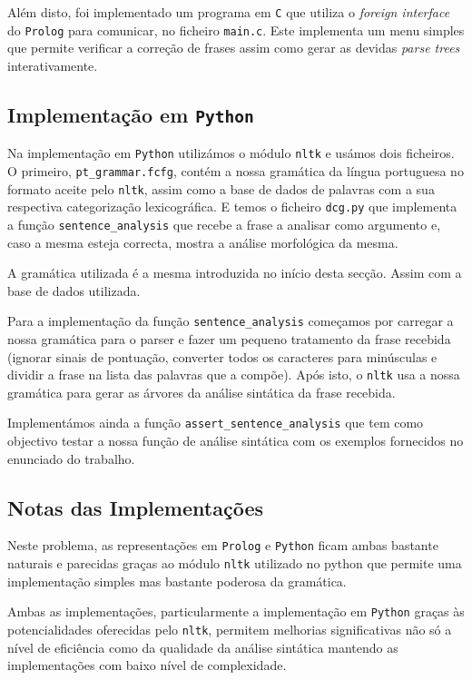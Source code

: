 \documentclass[12pt,a4paper,oneside]{article}
\begin{document}
Além disto, foi implementado um programa em \texttt{C} que utiliza o
\textit{foreign interface} do \texttt{Prolog} para comunicar, no
ficheiro \texttt{main.c}. Este implementa um menu simples que permite
verificar a correção de frases assim como gerar as devidas
\textit{parse trees} interativamente.

\subsection{Implementação em \texttt{Python}}

Na implementação em \texttt{Python} utilizámos o módulo \texttt{nltk} e
usámos dois ficheiros. O primeiro, \texttt{pt\_grammar.fcfg}, contém a nossa
gramática da língua portuguesa no formato aceite pelo \texttt{nltk}, assim como
a base de dados de palavras com a sua respectiva categorização lexicográfica.
E temos o ficheiro \texttt{dcg.py} que implementa a função \texttt{sentence\_analysis}
que recebe a frase a analisar como argumento e, caso a mesma esteja correcta, mostra
a análise morfológica da mesma.

A gramática utilizada é a mesma introduzida no início desta secção. Assim com a base
de dados utilizada.

Para a implementação da função \texttt{sentence\_analysis} começamos por carregar a
nossa gramática para o parser e fazer um pequeno tratamento da frase recebida (ignorar
sinais de pontuação, converter todos os caracteres para minúsculas e dividir a frase
na lista das palavras que a compõe). Após isto, o \texttt{nltk} usa a nossa gramática
para gerar as árvores da análise sintática da frase recebida.

Implementámos ainda a função \texttt{assert\_sentence\_analysis} que tem como objectivo
testar a nossa função de análise sintática com os exemplos fornecidos no enunciado do
trabalho.

\subsection{Notas das Implementações}

Neste problema, as representações em \texttt{Prolog} e \texttt{Python} ficam ambas bastante
naturais e parecidas graças ao módulo \texttt{nltk} utilizado no python que permite uma
implementação simples mas bastante poderosa da gramática.

Ambas as implementações, particularmente a implementação em \texttt{Python} graças às
potencialidades oferecidas pelo \texttt{nltk}, permitem melhorias significativas não só a
nível de eficiência como da qualidade da análise sintática mantendo as implementações com
baixo nível de complexidade.
\end{document}
